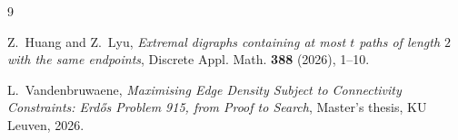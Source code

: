 \documentclass[10pt]{amsart}
\theoremstyle{remark}
\begin{document}
\begin{thebibliography}{9}

Z.~Huang and Z.~Lyu,
\emph{Extremal digraphs containing at most $t$ paths of length $2$ with the
same endpoints},
Discrete Appl. Math. \textbf{388} (2026), 1--10.

L.~Vandenbruwaene,
\emph{Maximising Edge Density Subject to Connectivity Constraints:
Erd\H{o}s Problem 915, from Proof to Search},
Master's thesis, KU Leuven, 2026.

\end{thebibliography}
\end{document}
